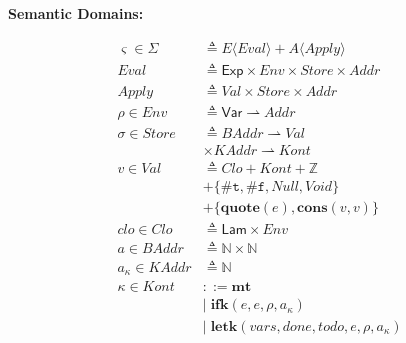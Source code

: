 \documentclass[12pt,draft]{article}
\newcommand{\truesyn}{\texttt{\#t}}
\newcommand{\falsesyn}{\texttt{\#f}}
\newcommand{\env}[0]{\rho}
\newcommand{\kaddr}[0]{a_{\kappa}}
\begin{document}
{\begin{multicols*}{2}
\vfill\null
\columnbreak


\begin{center}
\textbf{Semantic Domains:}
\end{center}
\vspace{-8mm}
\begin{align*}
\varsigma \in \Sigma &\triangleq E\langle\textit{Eval}\rangle
								+ A\langle\textit{Apply}\rangle \\
  \textit{Eval} &\triangleq \textsf{Exp} \times \textit{Env}
                  \times \textit{Store} \times \textit{Addr} \\
  \textit{Apply} &\triangleq \textit{Val} \times \textit{Store}
                   \times \textit{Addr} \\
  \rho \in \textit{Env} &\triangleq \textsf{Var} \rightharpoonup
	  											\textit{Addr} \\
  \sigma \in \textit{Store} &\triangleq \textit{BAddr} \rightharpoonup
                              \textit{Val} \\
  & \times \textit{KAddr} \rightharpoonup \textit{Kont} \\
  v \in \textit{Val} &\triangleq \textit{Clo} + \textit{Kont} + \mathbb{Z} \\
                     &+ \{ \truesyn,\falsesyn, \textit{Null} , \textit{Void} \} \\
                     &+ \{\textbf{quote}(e) , \textbf{cons}(v, v)\} \\
  clo \in \textit{Clo} &\triangleq \textsf{Lam} \times \textit{Env} \\
  a \in \textit{BAddr} &\triangleq \mathbb{N} \times \mathbb{N} \\
  a_\kappa \in \textit{KAddr} &\triangleq \mathbb{N} \\
  \kappa \in \textit{Kont} &::= \textbf{mt} \\
                     &|\; \textbf{ifk}(e, e, \env, \kaddr) \\
                     &|\; \textbf{letk}(vars, done, todo, e, \env , \kaddr) \\

\end{align*}
\end{multicols*}}
\end{document}
